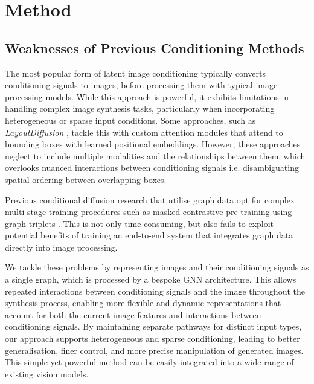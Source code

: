 \section{Method}
\label{sec:method}

\subsection{Weaknesses of Previous Conditioning Methods}

The most popular form of latent image conditioning typically converts conditioning signals to images, before processing them with typical image processing models. While this approach is powerful, it exhibits limitations in handling complex image synthesis tasks, particularly when incorporating heterogeneous or sparse input conditions. Some approaches, such as \textit{LayoutDiffusion} \cite{zheng_layoutdiffusion_2024}, tackle this with custom attention modules that attend to bounding boxes with learned positional embeddings. However, these approaches neglect to include multiple modalities and the relationships between them, which overlooks nuanced interactions between conditioning signals i.e. disambiguating spatial ordering between overlapping boxes. 



Previous conditional diffusion research that utilise graph data opt for complex multi-stage training procedures such as masked contrastive pre-training using graph triplets \cite{yang_diffusion-based_2022}. This is not only time-consuming, but also fails to exploit potential benefits of training an end-to-end system that integrates graph data directly into image processing. 

We tackle these problems by representing images and their conditioning signals as a single graph, which is processed by a bespoke GNN architecture. This allows repeated interactions between conditioning signals and the image throughout the synthesis process, enabling more flexible and dynamic representations that account for both the current image features and interactions between conditioning signals. By maintaining separate pathways for distinct input types, our approach supports heterogeneous and sparse conditioning, leading to better generalisation, finer control, and more precise manipulation of generated images. This simple yet powerful method can be easily integrated into a wide range of existing vision models.


